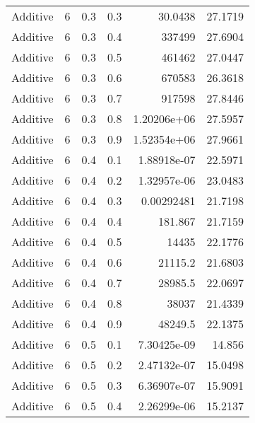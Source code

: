 \documentclass{article}
\begin{document}
\begin{longtable}[H]{lrrrrr}
 Additive       &       6 &   0.3 &            0.3 &     30.0438      &         27.1719 \\
 Additive       &       6 &   0.3 &            0.4 & 337499           &         27.6904 \\
 Additive       &       6 &   0.3 &            0.5 & 461462           &         27.0447 \\
 Additive       &       6 &   0.3 &            0.6 & 670583           &         26.3618 \\
 Additive       &       6 &   0.3 &            0.7 & 917598           &         27.8446 \\
 Additive       &       6 &   0.3 &            0.8 &      1.20206e+06 &         27.5957 \\
 Additive       &       6 &   0.3 &            0.9 &      1.52354e+06 &         27.9661 \\
 Additive       &       6 &   0.4 &            0.1 &      1.88918e-07 &         22.5971 \\
 Additive       &       6 &   0.4 &            0.2 &      1.32957e-06 &         23.0483 \\
 Additive       &       6 &   0.4 &            0.3 &      0.00292481  &         21.7198 \\
 Additive       &       6 &   0.4 &            0.4 &    181.867       &         21.7159 \\
 Additive       &       6 &   0.4 &            0.5 &  14435           &         22.1776 \\
 Additive       &       6 &   0.4 &            0.6 &  21115.2         &         21.6803 \\
 Additive       &       6 &   0.4 &            0.7 &  28985.5         &         22.0697 \\
 Additive       &       6 &   0.4 &            0.8 &  38037           &         21.4339 \\
 Additive       &       6 &   0.4 &            0.9 &  48249.5         &         22.1375 \\
 Additive       &       6 &   0.5 &            0.1 &      7.30425e-09 &         14.856  \\
 Additive       &       6 &   0.5 &            0.2 &      2.47132e-07 &         15.0498 \\
 Additive       &       6 &   0.5 &            0.3 &      6.36907e-07 &         15.9091 \\
 Additive       &       6 &   0.5 &            0.4 &      2.26299e-06 &         15.2137 \\

\end{longtable}
\end{document}
